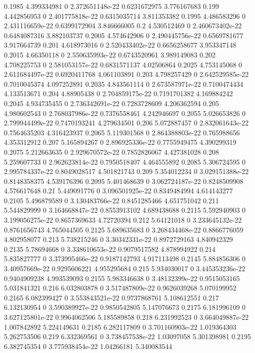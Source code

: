 {0.1985 4.399334981 0 2.372651148e-22 0.6231672975 3.776167683
0.199 4.442856953 0 2.401775818e-22 0.6315035714 3.811353382
0.1995 4.486583296 0 2.431116659e-22 0.6399172904 3.846666005
0.2 4.530512469 0 2.460673402e-22 0.6484087316 3.882103737
0.2005 4.574642906 0 2.490445756e-22 0.6569781677 3.917664739
0.201 4.618973016 0 2.520433402e-22 0.6656258677 3.953347148
0.2015 4.66350118 0 2.550635993e-22 0.6743520961 3.989149083
0.202 4.708225753 0 2.581053157e-22 0.6831571137 4.02506864
0.2025 4.753145068 0 2.611684497e-22 0.6920411768 4.061103891
0.203 4.798257429 0 2.642529585e-22 0.7010045374 4.097252891
0.2035 4.843561114 0 2.673587971e-22 0.7100474434 4.133513671
0.204 4.88905438 0 2.704859175e-22 0.7191701382 4.169884242
0.2045 4.934735455 0 2.736342691e-22 0.7283728609 4.206362594
0.205 4.980602543 0 2.768037986e-22 0.7376558461 4.242946697
0.2055 5.026653826 0 2.799944499e-22 0.7470193241 4.279634501
0.206 5.072887457 0 2.832061643e-22 0.7564635203 4.316423937
0.2065 5.119301568 0 2.864388803e-22 0.765988656 4.353312912
0.207 5.165894267 0 2.896925336e-22 0.7755949475 4.390299319
0.2075 5.212663635 0 2.929670572e-22 0.7852826067 4.427381028
0.208 5.259607733 0 2.962623814e-22 0.7950518407 4.464555892
0.2085 5.306724595 0 2.995784337e-22 0.8049028517 4.501821743
0.209 5.354012234 0 3.029151388e-22 0.8148358375 4.539176396
0.2095 5.401468639 0 3.062724187e-22 0.8248509908 4.576617648
0.21 5.449091776 0 3.096501925e-22 0.8349484994 4.614143277
0.2105 5.496879589 0 3.130483766e-22 0.8451285466 4.651751042
0.211 5.544829999 0 3.164668847e-22 0.8553913102 4.689438688
0.2115 5.592940903 0 3.199056275e-22 0.8657369633 4.72720394
0.212 5.64121018 0 3.233645132e-22 0.8761656743 4.765044505
0.2125 5.689635683 0 3.268434468e-22 0.8866776059 4.802958077
0.213 5.738215246 0 3.30342331e-22 0.8972729163 4.840942329
0.2135 5.78694668 0 3.338610653e-22 0.9079517582 4.878994922
0.214 5.835827777 0 3.373995466e-22 0.9187142793 4.917113498
0.2145 5.884856306 0 3.40957669e-22 0.9295606221 4.955295684
0.215 5.934030017 0 3.445353236e-22 0.9404909238 4.993539093
0.2155 5.983346638 0 3.48132399e-22 0.9515053165 5.031841321
0.216 6.032803878 0 3.517487809e-22 0.9626039268 5.070199952
0.2165 6.082399427 0 3.553843521e-22 0.9737868761 5.108612551
0.217 6.132130954 0 3.590389927e-22 0.9850542805 5.147076673
0.2175 6.181996109 0 3.627125801e-22 0.9964062506 5.185589858
0.218 6.231992523 0 3.664049887e-22 1.007842892 5.224149631
0.2185 6.282117809 0 3.701160903e-22 1.019364303 5.262753506
0.219 6.332369561 0 3.738457538e-22 1.03097058 5.301398981
0.2195 6.382745354 0 3.775938454e-22 1.04266181 5.340083544
}
